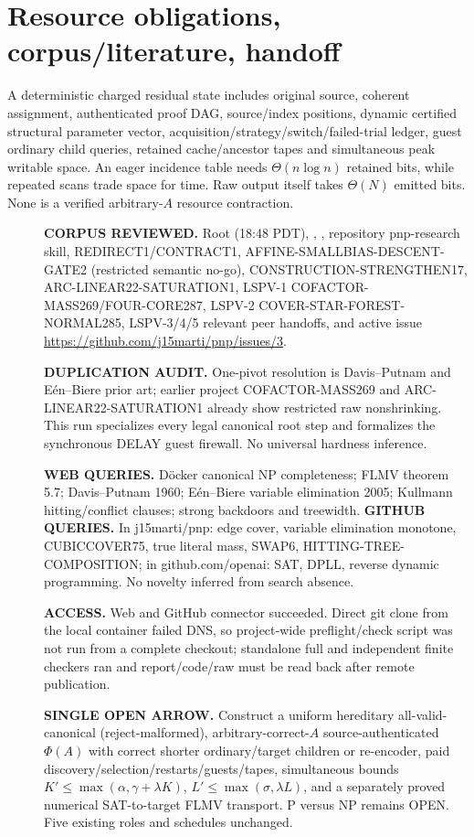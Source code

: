 \documentclass[10pt]{article}
\begin{document}
\section{Resource obligations, corpus/literature, handoff}
A deterministic charged residual state includes original source, coherent assignment, authenticated proof DAG, source/index positions, dynamic certified structural parameter vector, acquisition/strategy/switch/failed-trial ledger, guest ordinary child queries, retained cache/ancestor tapes and simultaneous peak writable space. An eager incidence table needs $\Theta(n\log n)$ retained bits, while repeated scans trade space for time. Raw output itself takes $\Theta(N)$ emitted bits. None is a verified arbitrary-$A$ resource contraction.
\begin{description}
\item[]\textbf{CORPUS REVIEWED.} Root  (18:48 PDT), , , repository pnp-research skill, REDIRECT1/CONTRACT1, AFFINE-SMALLBIAS-DESCENT-GATE2 (restricted semantic no-go), CONSTRUCTION-STRENGTHEN17, ARC-LINEAR22-SATURATION1, LSPV-1 COFACTOR-MASS269/FOUR-CORE287, LSPV-2 COVER-STAR-FOREST-NORMAL285, LSPV-3/4/5 relevant peer handoffs, and active issue \url{https://github.com/j15marti/pnp/issues/3}.
\item[]\textbf{DUPLICATION AUDIT.} One-pivot resolution is Davis--Putnam and E\'en--Biere prior art; earlier project COFACTOR-MASS269 and ARC-LINEAR22-SATURATION1 already show restricted raw nonshrinking. This run specializes every legal canonical root step and formalizes the synchronous DELAY guest firewall. No universal hardness inference.
\item[]\textbf{WEB QUERIES.} D\"ocker canonical NP completeness; FLMV theorem 5.7; Davis--Putnam 1960; E\'en--Biere variable elimination 2005; Kullmann hitting/conflict clauses; strong backdoors and treewidth. \textbf{GITHUB QUERIES.} In j15marti/pnp: edge cover, variable elimination monotone, CUBICCOVER75, true literal mass, SWAP6, HITTING-TREE-COMPOSITION; in github.com/openai: SAT, DPLL, reverse dynamic programming. No novelty inferred from search absence.
\item[]\textbf{ACCESS.} Web and GitHub connector succeeded. Direct git clone from the local container failed DNS, so project-wide preflight/check script was not run from a complete checkout; standalone full and independent finite checkers ran and report/code/raw must be read back after remote publication.
\item[]\textbf{SINGLE OPEN ARROW.} Construct a uniform hereditary all-valid-canonical (reject-malformed), arbitrary-correct-$A$ source-authenticated $\Phi(A)$ with correct shorter ordinary/target children or re-encoder, paid discovery/selection/restarts/guests/tapes, simultaneous bounds $K'\le\max(\alpha,\gamma+\lambda K)$, $L'\le\max(\sigma,\lambda L)$, and a separately proved numerical SAT-to-target FLMV transport. P versus NP remains OPEN. Five existing roles and schedules unchanged.
\end{description}
\end{document}
